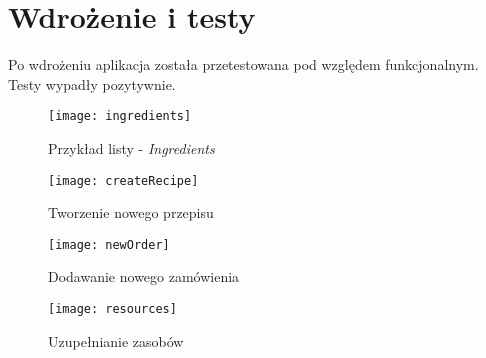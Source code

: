 \section{Wdrożenie i testy}
Po wdrożeniu aplikacja została przetestowana pod względem funkcjonalnym. Testy wypadły pozytywnie.

\begin{figure}[H]
	\centering
	\texttt{[image: ingredients]}
	\caption{Przykład listy - \textit{Ingredients}}
	\label{rys:ingredients}
\end{figure}

\begin{figure}[H]
\centering
\texttt{[image: createRecipe]}
\caption{Tworzenie nowego przepisu}
\label{rys:createRecipe}
\end{figure}

\begin{figure}[H]
\centering
\texttt{[image: newOrder]}
\caption{Dodawanie nowego zamówienia}
\label{rys:newOrder}
\end{figure}

\begin{figure}[H]
\centering
\texttt{[image: resources]}
\caption{Uzupełnianie zasobów}
\label{rys:resources}
\end{figure}

